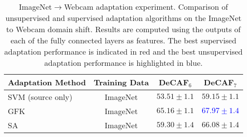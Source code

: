 \begin{table*}[t]
\centering
\begin{tabular}{lccc}
\toprule
Adaptation Method & Training Data & DeCAF$_6$ & DeCAF$_7$ \\
\midrule
SVM (source only) & ImageNet & $53.51 \pm 1.1$ & $59.15 \pm 1.1$ \\
\midrule
GFK \cite{gong-cvpr12} & ImageNet & $65.16 \pm 1.1$ & \textcolor{blue}{$\bm{67.97 \pm 1.4 }$}\\
SA \cite{sa} & ImageNet & $59.30 \pm 1.4$ & $66.08 \pm 1.4$ \\
\bottomrule
\end{tabular}
\caption{ImageNet$\rightarrow$Webcam adaptation experiment. Comparison of unsupervised and supervised adaptation algorithms on the ImageNet to Webcam domain shift. Results are computed using the outputs of each of the fully connected layers as features. The best supervised adaptation performance is indicated in red and the best unsupervised adaptation performance is highlighted in blue.}
\label{tab:fc6and7_imagenet_unsup}
\end{table*}

